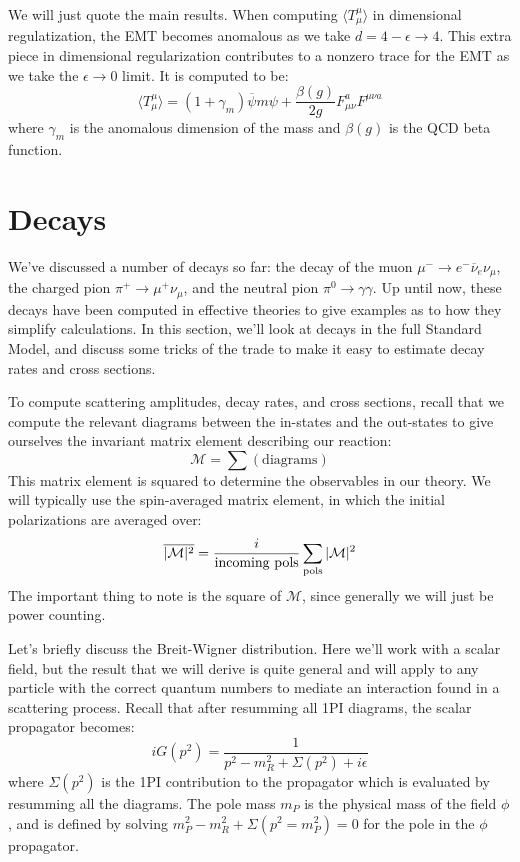 \documentclass[11pt, oneside]{article}   	%
\theoremstyle{definition}
\numberwithin{equation}{subsection}		%
\begin{document}
We will just quote the main results. When computing $\langle T_\mu^\mu\rangle$ in dimensional regulatization, the  
EMT becomes anomalous as we take $d = 4 - \epsilon\rightarrow 4$. This extra piece in dimensional 
regularization contributes to a nonzero trace for the EMT as we take the $\epsilon\rightarrow 0$ limit. It is computed to be:
\begin{equation}
	\langle T_\mu^\mu\rangle = (1 + \gamma_m) \overline\psi m \psi + \frac{\beta(g)}{2g}F_{\mu\nu}^a F^{\mu\nu a}
\end{equation}
where $\gamma_m$ is the anomalous dimension of the mass and $\beta(g)$ is the QCD beta function.

\newpage
\section{Decays}

We've discussed a number of decays so far: the decay of the muon $\mu^-\rightarrow e^-\overline\nu_e \nu_\mu$, the charged pion 
$\pi^+\rightarrow\mu^+ \nu_\mu$, and the neutral pion $\pi^0\rightarrow\gamma\gamma$. Up until now, these decays have been computed 
in effective theories to give examples as to how they simplify calculations. In this section, we'll look at decays in the full Standard Model, and 
discuss some tricks of the trade to make it easy to estimate decay rates and cross sections. 

To compute scattering amplitudes, decay rates, and cross sections, recall that we compute the relevant diagrams between the in-states and 
the out-states to give ourselves the invariant matrix element describing our reaction:
\begin{equation}
	\mathcal M = \sum(\mathrm{diagrams})
\end{equation}
This matrix element is squared to determine the observables in our theory. We will typically use the spin-averaged matrix element, in which 
the initial polarizations are averaged over:
\begin{equation}
	\overline{|\mathcal M|^2} = \frac{i}{\textnormal{incoming pols}}\sum_\mathrm{pols} |\mathcal M|^2
\end{equation}
The important thing to note is the square of $\mathcal M$, since generally we will just be power counting. 

Let's briefly discuss the Breit-Wigner distribution. Here we'll work with a scalar field, but the result that we will derive is quite general and 
will apply to any particle with the correct quantum numbers to mediate an interaction found in a scattering process. Recall that after resumming 
all 1PI diagrams, the scalar propagator becomes:
\begin{equation}
	i G(p^2) = \frac{1}{p^2 - m_R^2 + \Sigma(p^2) + i\epsilon}
\end{equation}
where $\Sigma(p^2)$ is the 1PI contribution to the propagator which is evaluated by resumming all the diagrams. The pole mass $m_P$ is the physical 
mass of the field $\phi$, and is defined by solving $m_P^2 - m_R^2 + \Sigma(p^2 = m_P^2) = 0$ for the pole in the $\phi$ propagator. 
\end{document}
